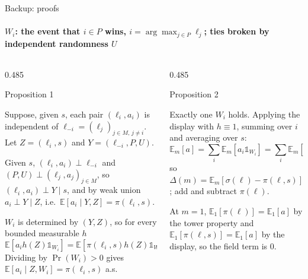 \documentclass[aspectratio=169,10pt,t]{beamer}
\newcommand{\paneltitle}[1]{{\color{accentdark}\small\firasemibold #1}\par\vspace{0.8mm}}
\begin{document}
\appendix

\begin{frame}{Backup: proofs}
  \framesubtitle{$W_i$: the event that $i \in P$ wins, $i = \arg\max_{j\in P}\ell_j$; ties broken by independent randomness $U$}
  \vspace{1.5mm}
  \footnotesize
  \begin{columns}[T,onlytextwidth]
    \begin{column}{0.485\textwidth}\raggedright
      \paneltitle{Proposition 1}
      Suppose, given $s$, each pair $(\ell_i, a_i)$ is independent of
      $\ell_{-i} = (\ell_j)_{j \in M,\, j \neq i}$. Let $Z = (\ell_i, s)$ and
      $Y = (\ell_{-i}, P, U)$.\par\vspace{1mm}
      Given $s$, $(\ell_i, a_i) \perp \ell_{-i}$ and $(P, U) \perp (\ell_j, a_j)_{j\in M}$, so
      $(\ell_i, a_i) \perp Y \mid s$, and by weak union $a_i \perp Y \mid Z$, i.e.\
      $\mathbb{E}[a_i \mid Y, Z] = \pi(\ell_i, s)$.\par\vspace{1mm}
      $W_i$ is determined by $(Y, Z)$, so for every bounded measurable $h$
      \[
        \mathbb{E}[a_i h(Z) \mathbb{1}_{W_i}] = \mathbb{E}[\pi(\ell_i, s) h(Z) \mathbb{1}_{W_i}].
      \]
      Dividing by $\Pr(W_i) > 0$ gives $\mathbb{E}[a_i \mid Z, W_i] = \pi(\ell_i, s)$ a.s.
    \end{column}
    \begin{column}{0.485\textwidth}\raggedright
      \paneltitle{Proposition 2}
      Exactly one $W_i$ holds. Applying the display with $h \equiv 1$, summing over $i$ and
      averaging over $s$:
      \[
        \mathbb{E}_m[a] = \textstyle\sum_i \mathbb{E}_m[a_i \mathbb{1}_{W_i}]
        = \textstyle\sum_i \mathbb{E}_m[\pi(\ell_i, s)\mathbb{1}_{W_i}]
        = \mathbb{E}_m[\pi(\ell, s)],
      \]
      so $\Delta(m) = \mathbb{E}_m[\sigma(\ell) - \pi(\ell, s)]$; add and subtract
      $\pi(\ell)$.\par\vspace{1mm}
      At $m = 1$, $\mathbb{E}_1[\pi(\ell)] = \mathbb{E}_1[a]$ by the tower property and
      $\mathbb{E}_1[\pi(\ell, s)] = \mathbb{E}_1[a]$ by the display, so the field term is 0.
    \end{column}
  \end{columns}
\end{frame}
\end{document}
